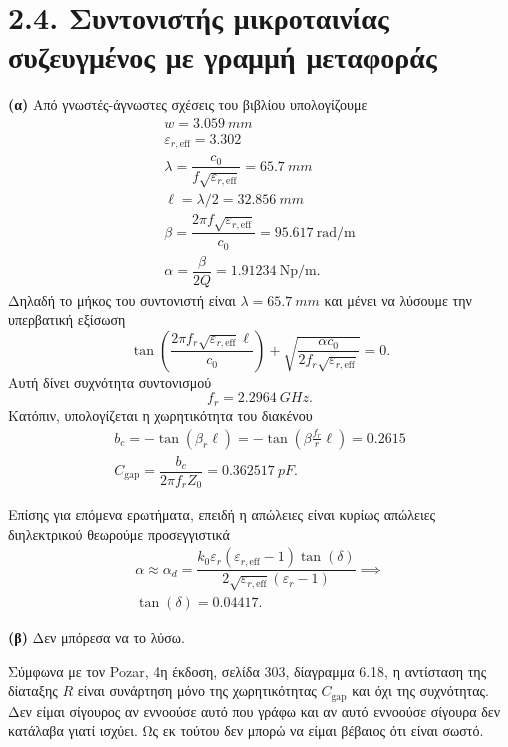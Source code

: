 \documentclass[12pt]{article}
\begin{document}
\newpage
\section*{2.4. Συντονιστής μικροταινίας συζευγμένος με γραμμή μεταφοράς}
\textbf{(α)} Από γνωστές-άγνωστες σχέσεις του βιβλίου υπολογίζουμε
\begin{gather}
    w = \SI{3.059}{mm } \\
    \varepsilon_{r, \text{eff}} = 3.302 \\
    \lambda = \dfrac{c_0 }{f\sqrt{\varepsilon_{r, \text{eff}}}} = \SI{65.7}{mm } \\
    \ell = \lambda/2 = \SI{32.856}{mm} \\
    \beta = \dfrac{2\pi f\sqrt{\varepsilon_{r, \text{eff}}}}{c_0} = \SI{95.617}{\radian\per\meter} \\
    \alpha = \dfrac{\beta }{2Q } = \SI{1.91234 }{\neper\per\meter }. 
\end{gather}
Δηλαδή το μήκος του συντονιστή είναι \(\lambda = \SI{65.7}{mm }\) και μένει να λύσουμε την υπερβατική εξίσωση
\begin{equation}
    \tan\left(\dfrac{2\pi f_r\sqrt{\varepsilon_{r, \text{eff}}}\ell}{c_0}\right) + \sqrt{\dfrac{\alpha c_0 }{2f_r\sqrt{\varepsilon_{r, \text{eff}}}}} = 0. 
\end{equation}
Αυτή δίνει συχνότητα συντονισμού 
\begin{equation*}
    f_r = \SI{2.2964}{GHz }.
\end{equation*}
Κατόπιν, υπολογίζεται η χωρητικότητα του διακένου
\begin{gather}
    b_c = -\tan(\beta_r\ell) = -\tan(\beta\frac{f_r}{r}\ell) = 0.2615\\ 
    C_\text{gap} = \dfrac{b_c }{2\pi f_r Z_0} = \SI{0.362517 }{pF}. 
\end{gather}

Επίσης για επόμενα ερωτήματα, επειδή η απώλειες είναι κυρίως απώλειες διηλεκτρικού θεωρούμε προσεγγιστικά 
\begin{gather}
    \alpha \approx \alpha_d = \dfrac{k_0\varepsilon_r(\varepsilon_{r, \text{eff}} - 1) \tan(\delta)}{2\sqrt{\varepsilon_{r, \text{eff}}}(\varepsilon_r - 1)} \implies \\
    \tan(\delta) = 0.04417.
\end{gather}

\textbf{(β)} Δεν μπόρεσα να το λύσω. 

Σύμφωνα με τον Pozar, 4η έκδοση, σελίδα 303, δίαγραμμα 6.18, η αντίσταση της δίαταξης \(R\) είναι συνάρτηση μόνο της χωρητικότητας \(C_\text{gap}\) και όχι της συχνότητας. Δεν είμαι σίγουρος αν εννοούσε αυτό που γράφω και αν αυτό εννοούσε σίγουρα δεν κατάλαβα γιατί ισχύει. Ως εκ τούτου δεν μπορώ να είμαι βέβαιος ότι είναι σωστό. 
\end{document}
